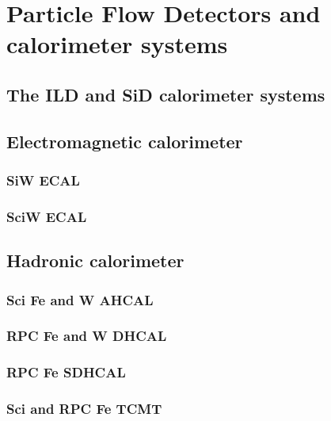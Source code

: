 \chapter{Particle Flow Detectors and calorimeter systems}

\section{The ILD and SiD calorimeter systems}

\section{Electromagnetic calorimeter}
\subsection{SiW ECAL}
\subsection{SciW ECAL}

\section{Hadronic calorimeter}
\subsection{Sci Fe and W AHCAL}
\subsection{RPC Fe and W DHCAL}
\subsection{RPC Fe SDHCAL}
\subsection{Sci and RPC Fe TCMT}
